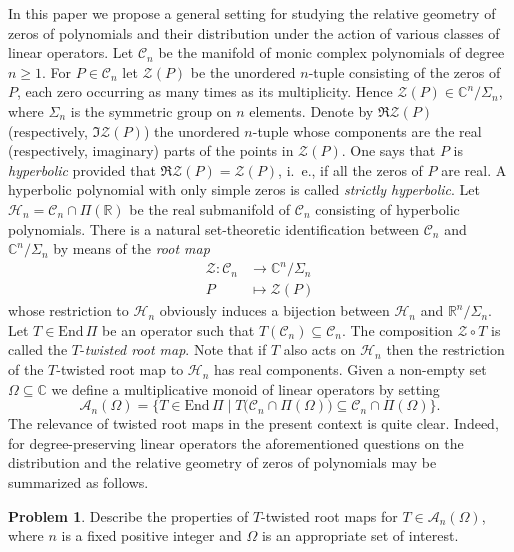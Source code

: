 \documentclass[10pt,twoside,a4paper,reqno]{amsart}
\theoremstyle{plain}
\theoremstyle{definition}
\newtheorem{problem}         {Problem}
\theoremstyle{remark}
\newcommand {\bC} {\mathbb {C}}
\newcommand {\bR} {\mathbb {R}}
\newcommand {\calH} {\mathcal {H}}
\newcommand {\calC} {\mathcal {C}}
\newcommand {\calA} {\mathcal {A}}
\newcommand {\calZ} {\mathcal {Z}}
\newcommand {\vP} {\varPi}
\newcommand {\E} {\text{End}\,}
\begin{document}
In this paper we propose a general setting for studying the relative 
geometry of zeros of polynomials and their distribution under the action of 
various classes of linear operators.
Let $\calC_n$ be the manifold of monic complex polynomials of 
degree $n\ge 1$. For 
$P\in \calC_n$ let $\calZ(P)$ be the unordered $n$-tuple consisting 
of the zeros of $P$, each zero occurring as many times as its multiplicity. 
Hence $\calZ(P)\in \bC^n/\Sigma_n$, where $\Sigma_n$ is the symmetric group on 
$n$ elements. Denote by $\Re \calZ(P)$ (respectively, $\Im \calZ(P)$) the 
unordered $n$-tuple whose components are the real (respectively, imaginary)  
parts of the points in $\calZ(P)$. One says that $P$ 
is {\em hyperbolic} provided that $\Re \calZ(P)=\calZ(P)$, i.~e., if all the 
zeros of $P$ are real. A hyperbolic polynomial with only simple zeros is 
called {\em strictly hyperbolic}. Let $\calH_{n}=\calC_n\cap \vP(\bR)$ be the 
real submanifold of $\calC_n$ 
consisting of hyperbolic polynomials. There is a natural set-theoretic 
identification between $\calC_n$ and $\bC^n/\Sigma_n$ by means of the 
{\em root map}
\begin{equation}\label{rmap}
\begin{split}
\calZ:\calC_n & \longrightarrow \bC^n/\Sigma_n\\
P & \longmapsto \calZ(P)
\end{split}
\end{equation}
whose restriction to $\calH_{n}$ obviously induces a bijection between 
$\calH_{n}$ and $\bR^n/\Sigma_n$. Let $T\in \E\vP$ be an operator such 
that $T(\calC_n)\subseteq \calC_n$. The 
composition $\calZ\circ T$ is called the $T$-{\em twisted root map}. Note 
that if $T$ also acts on $\calH_n$ then the restriction of the $T$-twisted 
root map to $\calH_{n}$ has real components. Given a non-empty set 
$\Omega\subseteq \bC$ we define a multiplicative monoid of linear operators 
by setting
\begin{equation}\label{monon}
\calA_n(\Omega)=\big\{T\in \E\vP\mid 
T\big(\calC_n\cap\vP(\Omega)\big)\subseteq \calC_n\cap\vP(\Omega)\big\}.
\end{equation}
The relevance of twisted root maps in the present context 
is quite clear. Indeed, for degree-preserving linear operators the 
aforementioned questions on the distribution and the relative geometry of 
zeros of polynomials may be summarized as follows.

\begin{problem}\label{pb1}
Describe the properties of $T$-twisted root maps for $T\in \calA_n(\Omega)$, 
where $n$ is a fixed positive integer and $\Omega$ is an appropriate set of 
interest.
\end{problem}
\end{document}
